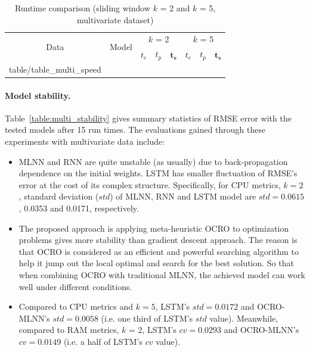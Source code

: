 \documentclass[11pt,twoside]{article}
\makeatletter
\newcommand\primitiveinput[1]
		{\@@input #1 }
\makeatother
\begin{document}
\begin{multicols}{2}
\begin{table}[!t]
	\caption{Runtime comparison (sliding window $k$ = 2 and $k$ = 5, multivariate dataset)}
	\label{table:multi_speed}
	\centering
		\begin{tabular}{| c | c | c | c | c | c | c | c |}%
			\hline
			\multirow{2}{*}{Data} & \multirow{2}{*}{Model} & \multicolumn{3}{c|}{$k$ = 2} & \multicolumn{3}{c|}{ $k$ = 5 } \\ \cline{3-8}
   				& & $t_e$ & $t_p$ & $\boldsymbol{t_s}$ & $t_e$ & $t_p$ & $\boldsymbol{t_s}$  \\ [0.5ex] \hline
			\primitiveinput{table/table_multi_speed}
			\hline
		\end{tabular}
\end{table}

\paragraph{\textbf{Model stability.}} Table~\ref{table:multi_stability} gives summary statistics of RMSE error with the tested models after 15 run times. The evaluations gained through these experiments with multivariate data include:
\begin{itemize}
	\item MLNN and RNN are quite unstable (as usually) due to back-propagation dependence on the initial weights. LSTM has smaller fluctuation of RMSE's error at the cost of its complex structure. Specifically, for CPU metrics, $k = 2$, standard deviation ($std$) of MLNN, RNN and LSTM model are $std = 0.0615$, 0.0353 and 0.0171, respectively. 
	\item The proposed approach is applying meta-heuristic OCRO to optimization problems gives more stability than gradient descent approach. The reason is that OCRO is considered as an efficient and powerful searching algorithm to help it jump out the local optimal and search for the best solution. So that when combining OCRO with traditional MLNN, the achieved model can work well under different conditions. 
	\item Compared to CPU metrics and $k = 5$, LSTM's $std = 0.0172$ and OCRO-MLNN's $std= 0.0058$ (i.e. one third of LSTM's $std$ value). Meanwhile, compared to RAM metrics, $k$ = 2, LSTM's $cv = 0.0293$ and OCRO-MLNN's $cv=0.0149$ (i.e. a half of LSTM's $cv$ value). 
\end{itemize}


\end{multicols}
\end{document}
